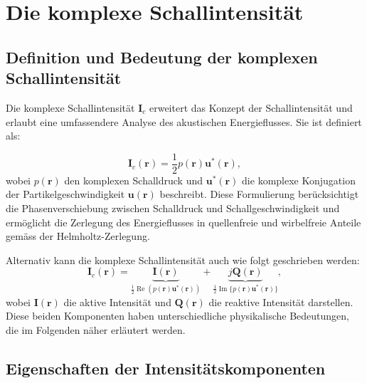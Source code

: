 %
%
%
%
\section{Die komplexe Schallintensität
\label{helmholtz:section:Schallintensitaet}}

\subsection{Definition und Bedeutung der komplexen Schallintensität
\label{helmholtz:subsection:def_Schallintensitaet}}

Die komplexe Schallintensität $\boldsymbol{I}_c$ erweitert das Konzept der Schallintensität und erlaubt eine umfassendere Analyse des akustischen Energieflusses. Sie ist definiert als:

\begin{equation}
\boldsymbol{I}_c (\boldsymbol{r})
=
\frac{1}{2} p(\boldsymbol{r}) \boldsymbol{u}^{*}(\boldsymbol{r}),
\label{helmholtz:equationIntensitaetKomplex}
\end{equation}
wobei $p(\boldsymbol{r})$ den komplexen Schalldruck und $\boldsymbol{u}^{*}(\boldsymbol{r})$ die komplexe Konjugation der Partikelgeschwindigkeit $\boldsymbol{u}(\boldsymbol{r})$ beschreibt. Diese Formulierung berücksichtigt die Phasenverschiebung zwischen Schalldruck und Schallgeschwindigkeit und ermöglicht die Zerlegung des Energieflusses in quellenfreie und wirbelfreie Anteile gemäss der Helmholtz-Zerlegung.

Alternativ kann die komplexe Schallintensität auch wie folgt geschrieben werden:
\begin{equation}
\boldsymbol{I}_c (\boldsymbol{r})
=
\underbrace{\boldsymbol{I}(\boldsymbol{r})}_{\frac{1}{2} \operatorname{Re} ( p(\boldsymbol{r}) \boldsymbol{u}^*(\boldsymbol{r}) )} + \underbrace{j\boldsymbol{Q}(\boldsymbol{r})}_{\frac{1}{2} \operatorname{Im} \{ p(\boldsymbol{r}) \boldsymbol{u}^*(\boldsymbol{r}) \}},
\label{helmholtz:equationIntensitaetKomplex_2}
\end{equation}  
wobei $\boldsymbol{I}(\boldsymbol{r})$ die aktive Intensität und
$\boldsymbol{Q}(\boldsymbol{r})$ die reaktive Intensität darstellen.
Diese beiden Komponenten haben unterschiedliche physikalische
Bedeutungen, die im Folgenden näher erläutert werden.

\subsection{Eigenschaften der Intensitätskomponenten
\label{helmholtz:subsection:def_Schallintensitaet}}

